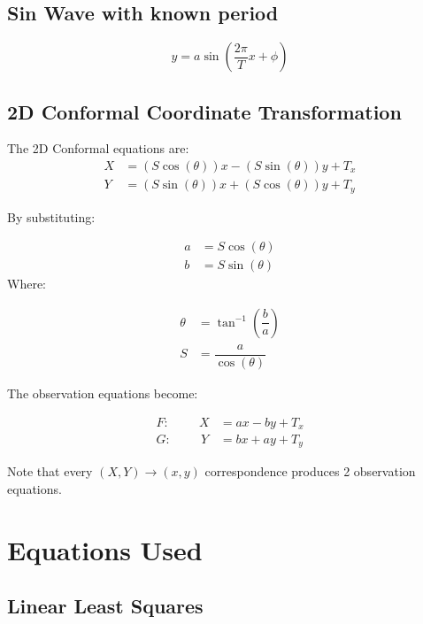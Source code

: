 \documentclass{report}
\begin{document}
\subsection*{Sin Wave with known period}
\[y = a\sin(\dfrac{2\pi}{T}x+\phi)\]
\clearpage
\subsection*{2D Conformal Coordinate Transformation}
The 2D Conformal equations are:
\begin{align*}
X &= (S\cos(\theta))x - (S\sin(\theta))y + T_x \\
Y &= (S\sin(\theta))x + (S\cos(\theta))y + T_y
\end{align*}

\noindent
By substituting: 

\begin{align*}
a &= S\cos(\theta) \\
b &= S\sin(\theta)
\end{align*}
Where:

\begin{align*}
\theta &= \tan^{-1}(\dfrac{b}{a}) \\
S &= \dfrac{a}{\cos(\theta)}
\end{align*}

\noindent
The observation equations become:

\begin{align*}
F: \hspace{1cm} X &= ax - by + T_x \\
G: \hspace{1cm} Y &= bx + ay + T_y
\end{align*}

\noindent
Note that every $(X,Y)\rightarrow(x,y)$ correspondence produces 2 observation equations.








\section*{Equations Used}
\subsection*{Linear Least Squares}
\end{document}
